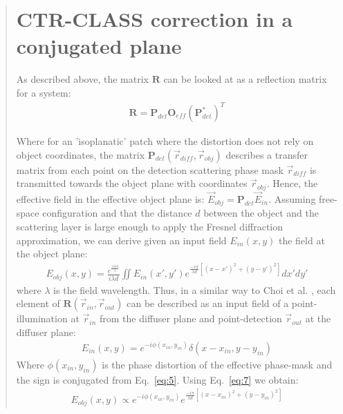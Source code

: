 \documentclass[12pt]{article}
\newenvironment{ourresponse}
    {\begin{tcolorbox}[width=\linewidth,breakable,enhanced,colback=gray!5,colframe=responsecolor!50,title=Response,left=5pt,right=5pt]}
    {\end{tcolorbox}}
\begin{document}
\begin{enumerate}[label=\arabic*.]
\begin{ourresponse}
\begin{quote}
            \newpage
            \section{CTR-CLASS correction in a conjugated plane}
            As described above, the matrix $\bm{R}$ can be looked at as a reflection matrix for a system:
            \begin{eqnarray}
            \bm{R} = \bm{P}_{det}\bm{O}_{eff} (\bm{P}^{*}_{det})^T
            \label{eq:5}
            \end{eqnarray}
            
            Where for an 'isoplanatic' patch where the distortion does not rely on object coordinates, the matrix $\bm{P}_{det}(\vec{r}_{diff},\vec{r}_{obj})$ describes a transfer matrix from each point on the detection scattering phase mask $\vec{r}_{diff}$ is transmitted towards the object plane with coordinates $\vec{r}_{obj}$. Hence, the effective field in the effective object plane is: $\vec{E}_{obj} = \bm{P}_{det}\vec{E}_{in}$. Assuming free-space configuration and that the distance $d$ between the object and the scattering layer is large enough to apply the Fresnel diffraction approximation, we can derive given an input field ${E}_{in}(x,y)$ the field at the object plane:
            \begin{eqnarray}
            {E}_{obj}(x,y)= \frac{e^{\frac{i2 \pi d}{\lambda}}}{i\lambda d} \iint {E}_{in}(x',y') 
            e^{\frac{-i\pi}{\lambda d} [ (x-x')^2+(y-y')^2 ] } dx'dy'
            \label{eq:6}
            \end{eqnarray}
            where $\lambda$ is the field wavelength. Thus, in a similar way to Choi et al. \cite{choi2022flexible}, each element of $\bm{R}(\vec{r}_{in},\vec{r}_{out})$ can be described as an input field of a point-illumination at $\vec{r}_{in}$ from the diffuser plane and point-detection $\vec{r}_{out}$ at the diffuser plane:
            \begin{eqnarray}
            {E}_{in}(x,y)= e^{-i\phi(x_{in},y_{in})}\delta(x-x_{in},y-y_{in})
            \label{eq:7}
            \end{eqnarray}
            Where $\phi(x_{in},y_{in})$ is the phase distortion of the effective phase-mask and the sign is conjugated from Eq.~\ref{eq:5}. Using Eq.~\ref{eq:7} we obtain:
            \begin{eqnarray}
            {E}_{obj}(x,y) \propto  e^{-i\phi(x_{in},y_{in})}
            e^{\frac{-i\pi}{\lambda d} [(x-x_{in})^2+(y-y_{in})^2 ]}
            \label{eq:8}

\end{eqnarray}
\end{quote}
\end{ourresponse}
\end{enumerate}
\end{document}
